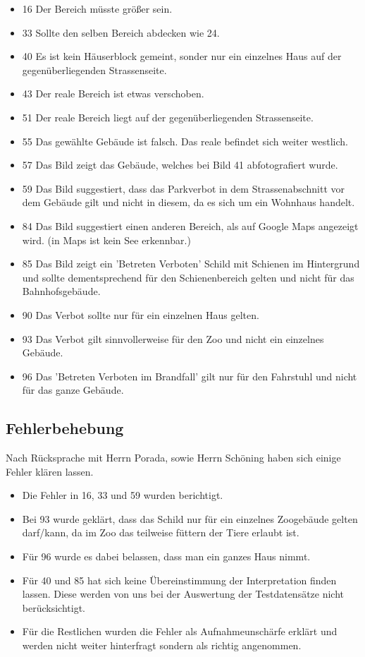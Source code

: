 \begin{itemize}
\item 16 Der Bereich müsste größer sein.
\item 33 Sollte den selben Bereich abdecken wie 24.
\item 40 Es ist kein Häuserblock gemeint, sonder nur ein einzelnes Haus auf der gegenüberliegenden Strassenseite.
\item 43 Der reale Bereich ist etwas verschoben.
\item 51 Der reale Bereich liegt auf der gegenüberliegenden Strassenseite.
\item 55 Das gewählte Gebäude ist falsch. Das reale befindet sich weiter westlich.
\item 57 Das Bild zeigt das Gebäude, welches bei Bild 41 abfotografiert wurde.
\item 59 Das Bild suggestiert, dass das Parkverbot in dem Strassenabschnitt vor dem Gebäude gilt und nicht in diesem, da es sich um ein Wohnhaus handelt.
\item 84 Das Bild suggestiert einen anderen Bereich, als auf Google Maps angezeigt wird. (in Maps ist kein See erkennbar.)
\item 85 Das Bild zeigt ein 'Betreten Verboten' Schild mit Schienen im Hintergrund und sollte dementsprechend für den Schienenbereich gelten und nicht für das Bahnhofsgebäude.
\item 90 Das Verbot sollte nur für ein einzelnen Haus gelten.
\item 93 Das Verbot gilt sinnvollerweise für den Zoo und nicht ein einzelnes Gebäude.
\item 96 Das 'Betreten Verboten im Brandfall' gilt nur für den Fahrstuhl und nicht für das ganze Gebäude.
\end{itemize}

\subsection{Fehlerbehebung}
Nach Rücksprache mit Herrn Porada, sowie Herrn Schöning haben sich einige Fehler klären lassen.
\begin{itemize}
\item Die Fehler in 16, 33 und 59 wurden berichtigt.
\item Bei 93 wurde geklärt, dass das Schild nur für ein einzelnes Zoogebäude gelten darf/kann, da im Zoo das teilweise füttern der Tiere erlaubt ist.
\item Für 96 wurde es dabei belassen, dass man ein ganzes Haus nimmt.
\item Für 40 und 85 hat sich keine Übereinstimmung der Interpretation finden lassen. Diese werden von uns bei der Auswertung der Testdatensätze nicht berücksichtigt.
\item Für die Restlichen wurden die Fehler als Aufnahmeunschärfe erklärt und werden nicht weiter hinterfragt sondern als richtig angenommen.
\end{itemize}


